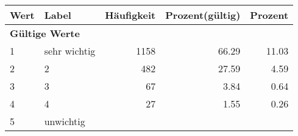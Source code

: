      \begin{longtable}{lXrrr}
     \toprule
     \textbf{Wert} & \textbf{Label} & \textbf{Häufigkeit} & \textbf{Prozent(gültig)} & \textbf{Prozent} \\
     \endhead
     \midrule
     \multicolumn{5}{l}{\textbf{Gültige Werte}}\\

     1 &
     \multicolumn{1}{X}{ sehr wichtig   } &


       \num{1158} &
       \num[round-mode=places,round-precision=2]{66.29} &
         \num[round-mode=places,round-precision=2]{11.03} \\

     2 &
     \multicolumn{1}{X}{ 2   } &


       \num{482} &
       \num[round-mode=places,round-precision=2]{27.59} &
         \num[round-mode=places,round-precision=2]{4.59} \\

     3 &
     \multicolumn{1}{X}{ 3   } &


       \num{67} &
       \num[round-mode=places,round-precision=2]{3.84} &
         \num[round-mode=places,round-precision=2]{0.64} \\

     4 &
     \multicolumn{1}{X}{ 4   } &


       \num{27} &
       \num[round-mode=places,round-precision=2]{1.55} &
         \num[round-mode=places,round-precision=2]{0.26} \\

     5 &
     \multicolumn{1}{X}{ unwichtig   } &



\end{longtable}
